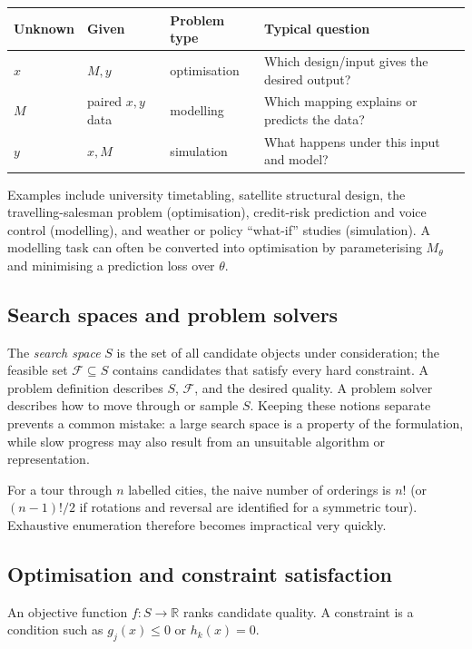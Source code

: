 \documentclass[11pt,a4paper]{article}
\newcommand{\R}{\mathbb{R}}
\begin{document}
\begin{center}
\begin{tabular}{lll p{}}
\toprule
Unknown & Given & Problem type & Typical question \\
\midrule
$x$ & $M,y$ & optimisation & Which design/input gives the desired output? \\
$M$ & paired $x,y$ data & modelling & Which mapping explains or predicts the data? \\
$y$ & $x,M$ & simulation & What happens under this input and model? \\
\bottomrule
\end{tabular}
\end{center}

Examples include university timetabling, satellite structural design, the
travelling-salesman problem (optimisation), credit-risk prediction and voice
control (modelling), and weather or policy ``what-if'' studies (simulation).
A modelling task can often be converted into optimisation by parameterising
$M_\theta$ and minimising a prediction loss over $\theta$.

\subsection{Search spaces and problem solvers}

The \emph{search space} $S$ is the set of all candidate objects under
consideration; the feasible set $\mathcal{F}\subseteq S$ contains candidates
that satisfy every hard constraint.  A problem definition describes $S$,
$\mathcal{F}$, and the desired quality.  A problem solver describes how to
move through or sample $S$.  Keeping these notions separate prevents a common
mistake: a large search space is a property of the formulation, while slow
progress may also result from an unsuitable algorithm or representation.

For a tour through $n$ labelled cities, the naive number of orderings is
$n!$ (or $(n-1)!/2$ if rotations and reversal are identified for a symmetric
tour).  Exhaustive enumeration therefore becomes impractical very quickly.

\subsection{Optimisation and constraint satisfaction}

An objective function $f:S\to\R$ ranks candidate quality.  A constraint is a
condition such as $g_j(x)\leq 0$ or $h_k(x)=0$.
\end{document}
